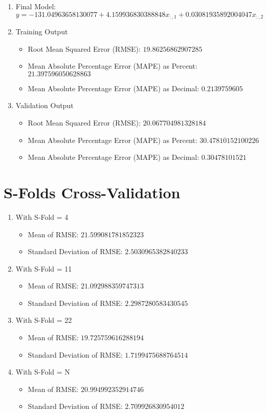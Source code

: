 \documentclass[12pt]{article}
\begin{document}
\begin{enumerate}
   \item Final Model: $y=-131.04963658130077 + 4.159936830388848x_{:,1} + 0.03081935892004047x_{:,2}$
   \item Training Output
   \begin{itemize}
     \item Root Mean Squared Error (RMSE): $19.86256862907285$
     \item Mean Absolute Percentage Error (MAPE) as Percent: $21.397596050628863$
     \item Mean Absolute Percentage Error (MAPE) as Decimal: $0.2139759605$
   \end{itemize}
   \item Validation Output
   \begin{itemize}
    \item Root Mean Squared Error (RMSE): $20.067704981328184$
    \item Mean Absolute Percentage Error (MAPE) as Percent: $30.47810152100226$
    \item Mean Absolute Percentage Error (MAPE) as Decimal: $0.30478101521$
   \end{itemize}
\end{enumerate}

\section{S-Folds Cross-Validation}\label{linreg}

\begin{enumerate}
   \item With S-Fold = 4
   \begin{itemize}
     \item Mean of RMSE: $21.599081781852323$
     \item Standard Deviation of RMSE: $2.5030965382840233$
   \end{itemize}
   
   \item With S-Fold = 11
   \begin{itemize}
     \item Mean of RMSE: $21.092988359747313$
     \item Standard Deviation of RMSE: $2.2987280583430545$
   \end{itemize}
   
   \item With S-Fold = 22
   \begin{itemize}
     \item Mean of RMSE: $19.725759616288194$
     \item Standard Deviation of RMSE: $1.7199475688764514$
   \end{itemize}
   
   \item With S-Fold = N
   \begin{itemize}
     \item Mean of RMSE: $20.994992352914746$
     \item Standard Deviation of RMSE: $2.709926830954012$
   \end{itemize}
\end{enumerate}
\end{document}
